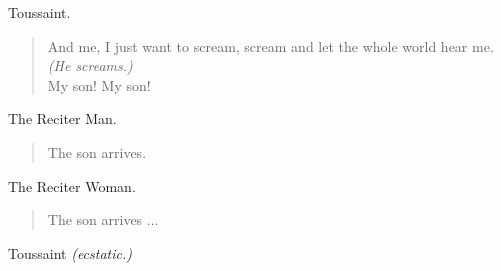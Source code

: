 \documentclass[letterpaper,article,12pt,oneside,notitlepage]{memoir}
\begin{document}
\begin{center}Toussaint.\end{center}

\begin{verse}
And me, I just want to scream, scream and let the whole world hear me. \textit{(He screams.)} \\
My son! My son! \\
\end{verse}

\begin{center}The Reciter Man.\end{center}

\begin{verse}
The son arrives. \\
\end{verse}

\clearpage

\begin{center}The Reciter Woman.\end{center}

\begin{verse}
The son arrives ... \\
\end{verse}

\begin{center}Toussaint \textit{(ecstatic.)}\end{center}
\end{document}
